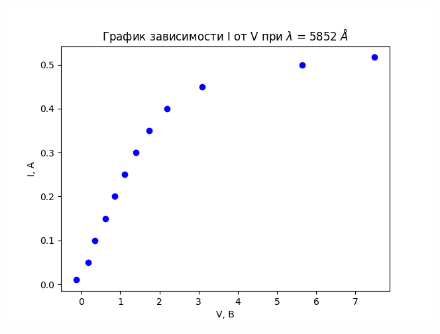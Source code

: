\documentclass[a4paper,12pt]{article}
\begin{document}
\begin{figure}[H]
\centering
\includegraphics[scale=0.73]{graph4.png}
\end{figure}
\end{document}
